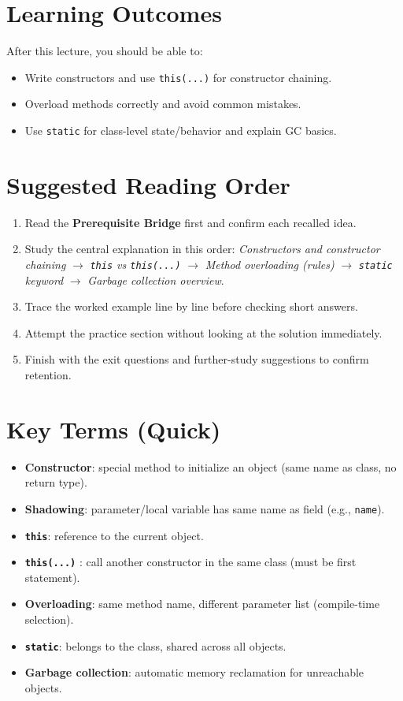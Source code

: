 \documentclass[11pt]{article}
\begin{document}
\section{Learning Outcomes}
After this lecture, you should be able to:
\begin{itemize}
  \item Write constructors and use \texttt{this(...)} for constructor chaining.
  \item Overload methods correctly and avoid common mistakes.
  \item Use \texttt{static} for class-level state/behavior and explain GC basics.
\end{itemize}

\section{Suggested Reading Order}
\begin{enumerate}
  \item Read the \textbf{Prerequisite Bridge} first and confirm each recalled idea.
  \item Study the central explanation in this order: \textit{Constructors and constructor chaining} $\rightarrow$ \textit{\texttt{this} vs \texttt{this(...)}} $\rightarrow$ \textit{Method overloading (rules)} $\rightarrow$ \textit{\texttt{static} keyword} $\rightarrow$ \textit{Garbage collection overview}.
  \item Trace the worked example line by line before checking short answers.
  \item Attempt the practice section without looking at the solution immediately.
  \item Finish with the exit questions and further-study suggestions to confirm retention.
\end{enumerate}
\notesources{\OOPSUnitIISources}

\section{Key Terms (Quick)}
\begin{itemize}
  \item \textbf{Constructor}: special method to initialize an object (same name as class, no return type).
  \item \textbf{Shadowing}: parameter/local variable has same name as field (e.g., \texttt{name}).
  \item \textbf{\texttt{this}}: reference to the current object.
  \item \textbf{\texttt{this(...)} }: call another constructor in the same class (must be first statement).
  \item \textbf{Overloading}: same method name, different parameter list (compile-time selection).
  \item \textbf{\texttt{static}}: belongs to the class, shared across all objects.
  \item \textbf{Garbage collection}: automatic memory reclamation for unreachable objects.
\end{itemize}
\end{document}
